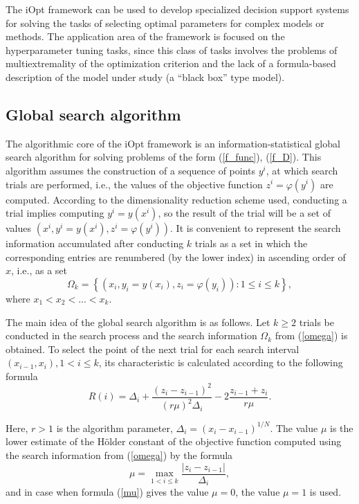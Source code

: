 \documentclass[preprint,12pt]{elsarticle}
\begin{document}
The iOpt framework can be used to develop specialized decision support systems for solving the tasks of selecting optimal parameters for complex models or methods. The application area of the framework is focused on the hyperparameter tuning tasks, since this class of tasks involves the problems of multiextremality of the optimization criterion and the lack of a formula-based description of the model under study (a ``black box'' type model).

\subsection{Global search algorithm}
\label{sec_GSA}

The algorithmic core of the iOpt framework is an information-statistical global search algorithm for solving problems of the form (\ref{f_func}), (\ref{f_D}). This algorithm assumes the construction of a sequence of points $y^i$,  at which search trials are performed, i.e., the values of the objective function $z^i = \varphi(y^i)$ are computed. According to the dimensionality reduction scheme used, conducting a trial implies computing $y^i=y(x^i)$, so the result of the trial will be a set of values $(x^i, y^i=y(x^i), z^i = \varphi(y^i))$. 
It is convenient to represent the search information accumulated after conducting $k$ trials as a set in which the corresponding entries are renumbered (by the lower index) in ascending order of $x$, i.e., as a set 
\begin{equation}\label{omega}
\Omega_k = \left\{  (x_i, y_i=y(x_i), z_i = \varphi(y_i)): 1 \leq i \leq k  \right\},	
\end{equation}
where $x_1 < x_2 < ... < x_k$.

The main idea of the global search algorithm is as follows. Let $k \geq 2$ trials be conducted in the search process and the search information $\Omega_k$ from (\ref{omega}) is obtained. To select the point of the next trial for each search interval $(x_{i-1},x_i), 1<i\leq k$, its characteristic is calculated according to the following formula
\begin{equation}\label{R}
R(i) = \Delta_i + \frac{(z_i-z_{i-1})^2}{(r\mu)^2\Delta_i}-2\frac{z_{i-1}+z_i}{r\mu}.	
\end{equation}

Here,  $r>1$ is the algorithm parameter, $\Delta_i=(x_i-x_{i-1})^{1/N}$.  The value $\mu$ is the lower estimate of the H\"older constant of the objective function computed using the search information from (\ref{omega}) by the formula
\begin{equation}\label{mu}
\mu = \max_{1<i\leq k}\frac{\left|z_i-z_{i-1}\right|}{\Delta_i},
\end{equation}
and in case when formula (\ref{mu}) gives the value $\mu=0$, the value $\mu=1$ is used.
\end{document}
